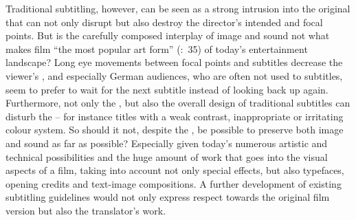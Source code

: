 Traditional subtitling, however, can be seen as a strong intrusion into the original  that can not only disrupt but also destroy the director’s intended  and focal points. But is the carefully composed interplay of image and sound not what makes film “the most popular art form” (\citealt{mercado2010}:~35) of today’s entertainment landscape? Long eye movements between focal points and subtitles decrease the viewer’s , and especially German audiences, who are often not used to subtitles, seem to prefer to wait for the next subtitle instead of looking back up again. Furthermore, not only the , but also the overall design of traditional subtitles can disturb the  – for instance titles with a weak contrast, inappropriate  or irritating colour system. So should it not, despite the , be possible to preserve both image and sound as far as possible? Especially given today’s numerous artistic and technical possibilities and the huge amount of work that goes into the visual aspects of a film, taking into account not only special effects, but also typefaces, opening credits and text-image compositions. A further development of existing subtitling guidelines would not only express respect towards the original film version but also the translator’s work.
 
